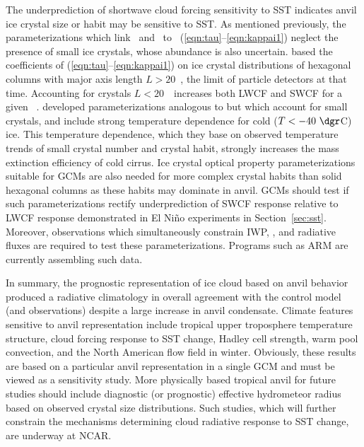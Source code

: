 \documentclass[agums]{aguplus}
\begin{document}
The underprediction of shortwave cloud forcing sensitivity to SST
indicates anvil ice crystal size or habit may be sensitive to SST.
As mentioned previously, the parameterizations which link \taui\ and
\kappai\ to \rei\ (\ref{eqn:tau}--\ref{eqn:kappai1}) neglect the
presence of small ice crystals, whose abundance is also uncertain. 
\cite{EbC92} based the coefficients of
(\ref{eqn:tau}--\ref{eqn:kappai1}) on ice crystal distributions of
hexagonal columns with major axis length $L > 20$~\um, the limit of
particle detectors at that time. 
Accounting for crystals $L < 20$~\um\ increases both LWCF and SWCF for
a given \qi\ \cite[]{ZeK94}. 
\cite{SuS95} developed parameterizations analogous to
\cite{EbC92} but which account for small crystals, and include
strong temperature dependence for cold ($T < -40\ \dgr$C) ice.
This temperature dependence, which they base on observed temperature
trends of small crystal number and crystal habit, strongly increases
the mass extinction efficiency of cold cirrus.
Ice crystal optical property parameterizations suitable for GCMs are 
also needed for more complex crystal habits than solid hexagonal
columns \cite[e.g.,][]{TaL95} as these habits may dominate in anvil.  
GCMs should test if such parameterizations rectify underprediction of
SWCF response relative to LWCF response demonstrated in El Ni\~no
experiments in Section~\ref{sec:sst}.  
Moreover, observations which simultaneously constrain IWP, \rei, and
radiative fluxes are required to test these parameterizations.
Programs such as ARM are currently assembling such data.

In summary, the prognostic representation of ice cloud based on anvil
behavior produced a radiative climatology in overall agreement with
the control model (and observations) despite a large increase in
anvil condensate.
Climate features sensitive to anvil representation include 
tropical upper troposphere temperature structure, cloud forcing
response to SST change, Hadley cell strength, warm pool convection,
and the North American flow field in winter.
Obviously, these results are based on a particular anvil
representation in a single GCM and must be viewed as a sensitivity 
study. 
More physically based tropical anvil for future studies should
include diagnostic (or prognostic) effective hydrometeor radius based
on observed crystal size distributions.
Such studies, which will further constrain the mechanisms determining
cloud radiative response to SST change, are underway at NCAR.
\end{document}
